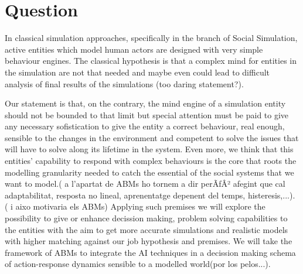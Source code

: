 \documentclass{report}
\begin{document}
%
%
%
%
%
%
%
\section{Question} 

In classical simulation approaches, specifically in the branch of Social Simulation, active entities which model human actors are designed with very simple behaviour engines. The classical hypothesis is that a complex mind for entities in the simulation are not that needed and maybe even could lead to difficult analysis of final results of the simulations (too daring statement?). 

Our statement is that, on the contrary, the mind engine of a simulation entity should not be bounded to that limit but special attention must be paid to give any necessary sofistication to give the entity a correct behaviour, real enough, sensible to the changes in the environment and competent to solve the issues that will have to solve along its lifetime in the system. Even more, we think that this entities' capability to respond with complex behaviours is the core that roots the modelling granularity needed to catch the essential of the social systems that we want to model.( a l'apartat de ABMs ho tornem a dir perÃƒÂ² afegint que cal adaptabilitat, resposta no lineal, aprenentatge depenent del temps, histeresis,...).\\
( i aixo motivaria els ABMs) Applying such premises we will explore the possibility to give or enhance decission
making, problem solving capabilities to the entities with the aim to get more accurate simulations and realistic models with higher matching against our job hypothesis and premises. We will take the framework of ABMs to integrate the AI techniques in a decission making schema of action-response dynamics sensible to a modelled world(por los pelos...).\\
\end{document}

